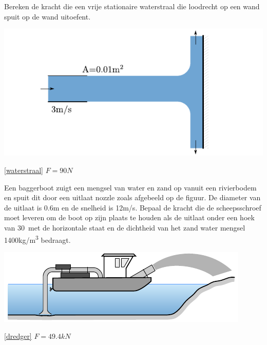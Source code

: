 \begin{toepassing}[*]
	\label{waterstraal}
Bereken de kracht die een vrije stationaire waterstraal die loodrecht op een wand spuit op de wand uitoefent.

	\centering
	\includegraphics{fig/behoudsvergelijkingen/waterstraal}
\end{toepassing}
\begin{antwoord}{\ref{waterstraal}}
	$F = 90\unit{N}$
\end{antwoord}
\begin{toepassing}
	\label{dredger}
Een baggerboot zuigt een mengsel van water en zand op vanuit een rivierbodem en spuit dit door een uitlaat nozzle zoals afgebeeld op de figuur. De diameter van de uitlaat is 0.6m en de snelheid is 12m/s. Bepaal de kracht die de scheepsschroef moet leveren om de boot op zijn plaats te houden als de uitlaat onder een hoek van 30\deg\ met de horizontale staat en de dichtheid van het zand water mengsel 1400\unit{kg/m^3} bedraagt.

	\centering
	\includegraphics{fig/behoudsvergelijkingen/dredger}
\end{toepassing}
\begin{antwoord}{\ref{dredger}}
	$F = 49.4\unit{kN}$
\end{antwoord}

